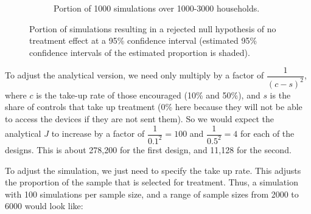 \documentclass[12pt]{article}
\begin{document}
\begin{figure}[h!]
\begin{subfigure}{\widthfrac\textwidth}
    \caption{Portion of 1000 simulations over 1000-3000  households.}
    \label{fig1-2c}
  \end{subfigure}
\caption{Portion of simulations resulting in a rejected null hypothesis of no treatment effect at a 95\% confidence interval (estimated 95\% confidence intervals of the estimated proportion is shaded).}
\label{fig1-2}
\end{figure}
\FloatBarrier


\newpage
{}

To adjust the analytical version, we need only multiply by a factor of $\dfrac{1}{(c-s)^2}$, where $c$ is the take-up rate of those encouraged (10\% and 50\%), and $s$ is the share of controls that take up treatment (0\% here because they will not be able to access the devices if they are not sent them). So we would expect the analytical $J$ to increase by a factor of $\dfrac{1}{0.1^2}=100$ and $\dfrac{1}{0.5^2}=4$ for each of the designs. This is about 278,200 for the first design, and 11,128 for the second.

To adjust the simulation, we just need to specify the take up rate. This adjusts the proportion of the sample that is selected for treatment. Thus, a simulation with 100 simulations per sample size, and a range of sample sizes from 2000 to 6000 would look like:
\end{document}
